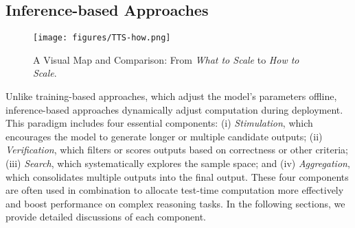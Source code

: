 
\subsection{Inference-based Approaches}
\label{subsec:inference}

\begin{figure}[!htbp]
    \centering
    \texttt{[image: figures/TTS-how.png]}
    \caption{A Visual Map and Comparison: From \textit{What to Scale} to \textit{How to Scale}.}
    \label{fig:illustration}
\end{figure}

Unlike training-based approaches, which adjust the model’s parameters offline, inference-based approaches dynamically adjust computation during deployment. This paradigm includes four essential components: (i) \textit{Stimulation}, which encourages the model to generate longer or multiple candidate outputs; (ii) \textit{Verification}, which filters or scores outputs based on correctness or other criteria; (iii) \textit{Search}, which systematically explores the sample space; and (iv) \textit{Aggregation}, which consolidates multiple outputs into the final output. These four components are often used in combination to allocate test-time computation more effectively and boost performance on complex reasoning tasks. In the following sections, we provide detailed discussions of each component.









